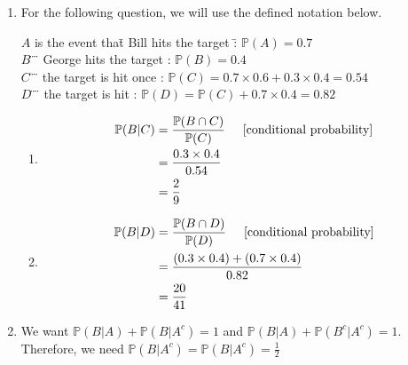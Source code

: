 \documentclass[a4paper]{article}
\newcommand{\p}{\mathbb{P}}
\newcommand{\ds}{\displaystyle}
\begin{document}
\begin{enumerate}
\begin{enumerate}
	\end{enumerate}

	\bigbreak

	\item For the following question, we will use the defined notation below.
	\begin{tabbing}
		$\ds{A}$ is the event tha\=t Bill hits the target \hspace{5mm}\=: $\ds{\p(A) = 0.7}$ \\
		$\ds{B}$ \"{} \>\"{} George hits the target \>: $\ds{\p(B) = 0.4}$ \\
		$\ds{C}$ \"{} \>\"{} the target is hit once \>: $\ds{\p(C) = 0.7\times0.6 + 0.3\times0.4 = 0.54}$ \\
		$\ds{D}$ \"{} \>\"{} the target is hit \>: $\ds{\p(D) = \p(C) + 0.7\times0.4 = 0.82}$ \\
	\end{tabbing}

	\pagebreak

	\begin{enumerate}

		\item 
		\begin{align*}
			\p(B|C) & = \frac{\p(B \cap C)}{\p(C)} \hspace{5mm} \text{[conditional probability]} \\
			& = \frac{0.3\times0.4}{0.54} \\
			& = \frac{2}{9} \\
		\end{align*}

		\item 
		\begin{align*}
			\p(B|D) & = \frac{\p(B \cap D)}{\p(D)} \hspace{5mm} \text{[conditional probability]} \\
			& = \frac{(0.3\times0.4) + (0.7\times0.4)}{0.82} \\
			& = \frac{20}{41} \\
		\end{align*}

	\end{enumerate}

	\bigbreak

	\item We want $\ds{\p(B|A) + \p(B|A^{c}) = 1}$ and $\ds{\p(B|A) + \p(B^{c}|A^{c}) = 1}$. Therefore, we need $\ds{\p(B|A^{c}) = \p(B|A^{c}) = \frac{1}{2}}$

	\begin{center}
		\begin{tikzpicture}


\end{tikzpicture}
\end{center}
\end{enumerate}
\end{document}
